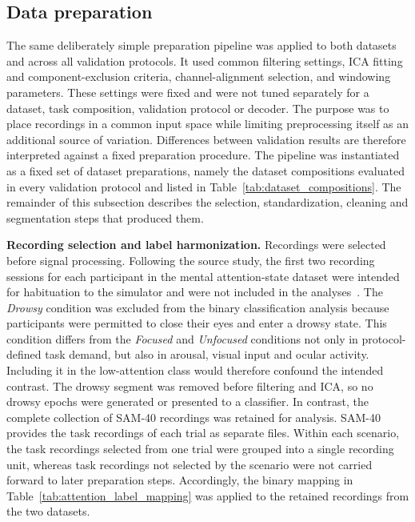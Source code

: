 \documentclass[10pt,letterpaper]{article}
\newcommand{\rev}[1]{#1}
\begin{document}

\FloatBarrier

\subsection*{Data preparation}

\rev{The same deliberately simple preparation pipeline was applied to
both datasets and across all validation protocols. It used common filtering
settings, ICA fitting and component-exclusion criteria, channel-alignment
selection, and windowing parameters. These settings were fixed and were not tuned
separately for a dataset, task composition, validation protocol or decoder. The
purpose was to place recordings in a common input space while limiting
preprocessing itself as an additional source of variation. Differences between
validation results are therefore interpreted against a fixed preparation
procedure. The pipeline was instantiated as a fixed set of dataset
preparations, namely the dataset compositions evaluated in every validation
protocol and listed in
Table~\ref{tab:dataset_compositions}. The remainder of this subsection
describes the selection, standardization, cleaning and segmentation steps that
produced them.}



\rev{\textbf{Recording selection and label harmonization.} Recordings were selected
before signal processing. Following the source study, the first two recording
sessions for each participant in the mental attention-state dataset were
intended for habituation to the simulator and were not included in the
analyses~\cite{aci2019attention}. The \textit{Drowsy} condition was excluded
from the binary classification analysis because participants were
permitted to close their eyes and enter a drowsy state. This condition differs
from the \textit{Focused} and \textit{Unfocused} conditions not only in
protocol-defined task demand, but also in arousal, visual input and ocular
activity. Including it in the low-attention class would therefore confound the
intended contrast. The drowsy segment was removed before filtering and ICA, so
no drowsy epochs were generated or presented to a classifier. In contrast, the complete collection of SAM-40 recordings was
retained for analysis. SAM-40 provides the task recordings of each trial as
separate files. Within each scenario, the task recordings selected from one
trial were grouped into a single recording unit, whereas task recordings not
selected by the scenario were not carried forward to later preparation steps.
Accordingly, the binary mapping in Table~\ref{tab:attention_label_mapping} was applied to the
retained recordings from the two datasets.}
\end{document}
